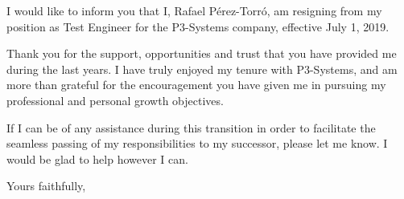 \documentclass[12pt,stdletter,dateno,sigleft]{newlfm} %
\begin{document}
\begin{newlfm}

I would like to inform you that I, Rafael P\'erez-Torr\'o, am resigning from my position as Test Engineer for the P3-Systems company, effective July 1, 2019.

Thank you for the support, opportunities and trust that you have provided me during the last years. I have truly enjoyed my tenure with P3-Systems, and am more than grateful for the encouragement you have given me in pursuing my professional and personal growth objectives.

If I can be of any assistance during this transition in order to facilitate the seamless passing of my responsibilities to my successor, please let me know. I would be glad to help however I can.

Yours faithfully, \newline\newline %


\end{newlfm}
\end{document}
